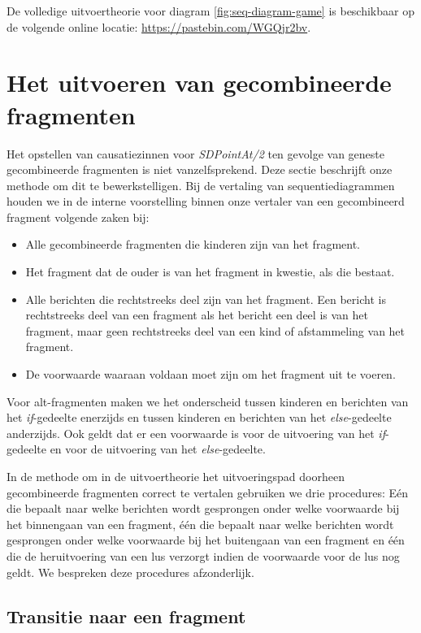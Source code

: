 De volledige uitvoertheorie voor diagram \ref{fig:seq-diagram-game} is beschikbaar op de volgende online locatie: \url{https://pastebin.com/WGQjr2bv}.

\section{Het uitvoeren van gecombineerde fragmenten}\label{sec:combined-fragment}
Het opstellen van causatiezinnen voor \textit{SDPointAt/2} ten gevolge van geneste gecombineerde fragmenten is niet vanzelfsprekend. Deze sectie beschrijft onze methode om dit te bewerkstelligen.
Bij de vertaling van sequentiediagrammen houden we in de interne voorstelling binnen onze vertaler van een gecombineerd fragment volgende zaken bij:

\begin{itemize}
	\item Alle gecombineerde fragmenten die kinderen zijn van het fragment.
	\item Het fragment dat de ouder is van het fragment in kwestie, als die bestaat.
	\item Alle berichten die rechtstreeks deel zijn van het fragment. Een bericht is rechtstreeks deel van een fragment als het bericht een deel is van het fragment, maar geen rechtstreeks deel van een kind of afstammeling van het fragment.
	\item De voorwaarde waaraan voldaan moet zijn om het fragment uit te voeren. 
\end{itemize}

Voor alt-fragmenten maken we het onderscheid tussen kinderen en berichten van het \textit{if}-gedeelte enerzijds en tussen kinderen en berichten van het \textit{else}-gedeelte anderzijds. Ook geldt dat er een voorwaarde is voor de uitvoering van het \textit{if}-gedeelte en voor de uitvoering van het \textit{else}-gedeelte.

In de methode om in de uitvoertheorie het uitvoeringspad doorheen gecombineerde fragmenten correct te vertalen gebruiken we drie procedures: E\'en die bepaalt naar welke berichten wordt gesprongen onder welke voorwaarde bij het binnengaan van een fragment, \'e\'en die bepaalt naar welke berichten wordt gesprongen onder welke voorwaarde bij het buitengaan van een fragment en \'e\'en die de heruitvoering van een lus verzorgt indien de voorwaarde voor de lus nog geldt. We bespreken deze procedures afzonderlijk.

\subsection{Transitie naar een fragment}\label{sec:transition-to}

